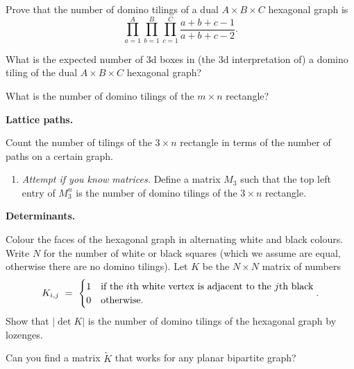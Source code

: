 \documentclass[11pt,fleqn]{book} %
\begin{document}
\begin{problem}
Prove that the number of domino tilings of a dual $A \times B \times C$ hexagonal graph is 
$$\prod_{a=1}^A \prod_{b=1}^B \prod_{c=1}^C \frac{a+b+c-1}{a+b+c-2}.$$
\end{problem}


\begin{problem}
What is the expected number of 3d boxes in (the 3d interpretation of) a domino tiling of the dual $A\times B \times C$ hexagonal graph?
\end{problem}



\begin{problem}
What is the number of domino tilings of the $m\times n$ rectangle?
\end{problem}



\textbf{Lattice paths.}






\begin{problem}
Count the number of tilings of the $3\times n$ rectangle in terms of the number of paths on a certain graph. 
\begin{enumerate}[label=\alph*.]
\item \textit{Attempt if you know matrices.} Define a matrix $M_3$ such that the top left entry of $M_3^n$ is the number of domino tilings of the $3\times n$ rectangle.
\end{enumerate}
\end{problem}





\textbf{Determinants.}


\begin{problem}
   Colour the faces of the hexagonal graph in alternating white and black colours. Write $N$ for the number of white or black squares (which we assume are equal, otherwise there are no domino tilings). Let $K$ be the $N\times N$ matrix of numbers
$$K_{i,j} \ = \ \begin{cases}
    1 & \textup{if the }i \textup{th white vertex is adjacent to the }j \textup{th black} \\
    0 & \textup{otherwise.}
\end{cases}.$$
Show that $|\det K|$ is the number of domino tilings of the hexagonal graph by lozenges.

Can you find a matrix $\tilde{K}$ that works for any planar bipartite graph?
\end{problem}
\end{document}
